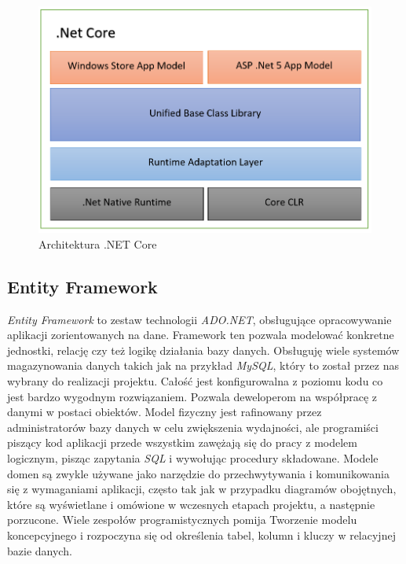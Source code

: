 \documentclass[12pt,a4paper]{article}
\begin{document}
\begin{figure}[H]
	\centering
	\includegraphics[width=0.7\linewidth]{net-Core-1}
	\caption{Architektura .NET Core}
	\label{fig:net-core-1}
\end{figure}

\subsection{Entity Framework}   %

\hspace*{0.7cm} \textit{Entity Framework} to zestaw technologii \textit{ADO.NET}, obsługujące opracowywanie aplikacji zorientowanych na dane. Framework ten pozwala modelować konkretne jednostki, relację czy też logikę działania bazy danych. Obsługuję wiele systemów magazynowania danych takich jak na przykład \textit{MySQL}, który to został przez nas wybrany do realizacji projektu. Całość jest konfigurowalna z poziomu kodu co jest bardzo wygodnym rozwiązaniem. Pozwala deweloperom na współpracę z danymi w postaci obiektów. Model fizyczny jest rafinowany przez administratorów bazy danych w celu zwiększenia wydajności, ale programiści piszący kod aplikacji przede wszystkim zawężają się do pracy z modelem logicznym, pisząc zapytania \textit{SQL} i wywołując procedury składowane. Modele domen są zwykle używane jako narzędzie do przechwytywania i komunikowania się z wymaganiami aplikacji, często tak jak w przypadku diagramów obojętnych, które są wyświetlane i omówione w wczesnych etapach projektu, a następnie porzucone. Wiele zespołów programistycznych pomija Tworzenie modelu koncepcyjnego i rozpoczyna się od określenia tabel, kolumn i kluczy w relacyjnej bazie danych.\newline
\end{document}
